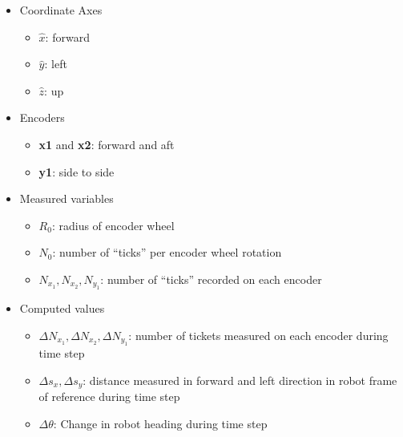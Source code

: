 \begin{itemize}
\item Coordinate Axes

\begin{itemize}
\item \(\hat{x}\): forward

\item \(\hat{y}\): left

\item \(\hat{z}\): up

\end{itemize}

\item Encoders

\begin{itemize}
\item \textbf{x1} and \textbf{x2}: forward and aft

\item \textbf{y1}: side to side

\end{itemize}

\item Measured variables

\begin{itemize}
\item \(R_0\): radius of encoder wheel

\item \(N_0\): number of ``ticks'' per encoder wheel rotation

\item \(N_{x_1}, N_{x_2}, N_{y_1}\): number of ``ticks'' recorded on each encoder

\end{itemize}

\item Computed values

\begin{itemize}
\item \(\Delta N_{x_1}, \Delta N_{x_2}, \Delta N_{y_1}\): number of tickets measured on each encoder during time step

\item \(\Delta s_x, \Delta s_y\): distance measured in forward and left direction in robot frame of reference during time step

\item \(\Delta \theta\): Change in robot heading during time step

\end{itemize}

\end{itemize}

